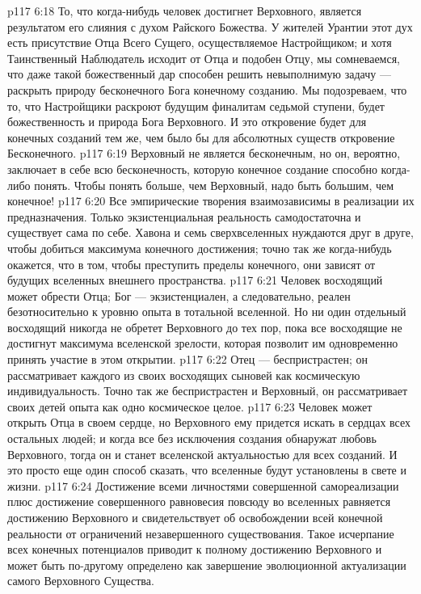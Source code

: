 \vs p117 6:18 То, что когда\hyp{}нибудь человек достигнет Верховного, является результатом его слияния с духом Райского Божества. У жителей Урантии этот дух есть присутствие Отца Всего Сущего, осуществляемое Настройщиком; и хотя Таинственный Наблюдатель исходит от Отца и подобен Отцу, мы сомневаемся, что даже такой божественный дар способен решить невыполнимую задачу --- раскрыть природу бесконечного Бога конечному созданию. Мы подозреваем, что то, что Настройщики раскроют будущим финалитам седьмой ступени, будет божественность и природа Бога Верховного. И это откровение будет для конечных созданий тем же, чем было бы для абсолютных существ откровение Бесконечного.
\vs p117 6:19 Верховный не является бесконечным, но он, вероятно, заключает в себе всю бесконечность, которую конечное создание способно когда\hyp{}либо понять. Чтобы понять больше, чем Верховный, надо быть большим, чем конечное!
\vs p117 6:20 Все эмпирические творения взаимозависимы в реализации их предназначения. Только экзистенциальная реальность самодостаточна и существует сама по себе. Хавона и семь сверхвселенных нуждаются друг в друге, чтобы добиться максимума конечного достижения; точно так же когда\hyp{}нибудь окажется, что в том, чтобы преступить пределы конечного, они зависят от будущих вселенных внешнего пространства.
\vs p117 6:21 Человек восходящий может обрести Отца; Бог --- экзистенциален, а следовательно, реален безотносительно к уровню опыта в тотальной вселенной. Но ни один отдельный восходящий никогда не обретет Верховного до тех пор, пока все восходящие не достигнут максимума вселенской зрелости, которая позволит им одновременно принять участие в этом открытии.
\vs p117 6:22 Отец --- беспристрастен; он рассматривает каждого из своих восходящих сыновей как космическую индивидуальность. Точно так же беспристрастен и Верховный, он рассматривает своих детей опыта как одно космическое целое.
\vs p117 6:23 Человек может открыть Отца в своем сердце, но Верховного ему придется искать в сердцах всех остальных людей; и когда все без исключения создания обнаружат любовь Верховного, тогда он и станет вселенской актуальностью для всех созданий. И это просто еще один способ сказать, что вселенные будут установлены в свете и жизни.
\vs p117 6:24 Достижение всеми личностями совершенной самореализации плюс достижение совершенного равновесия повсюду во вселенных равняется достижению Верховного и свидетельствует об освобождении всей конечной реальности от ограничений незавершенного существования. Такое исчерпание всех конечных потенциалов приводит к полному достижению Верховного и может быть по\hyp{}другому определено как завершение эволюционной актуализации самого Верховного Существа.
